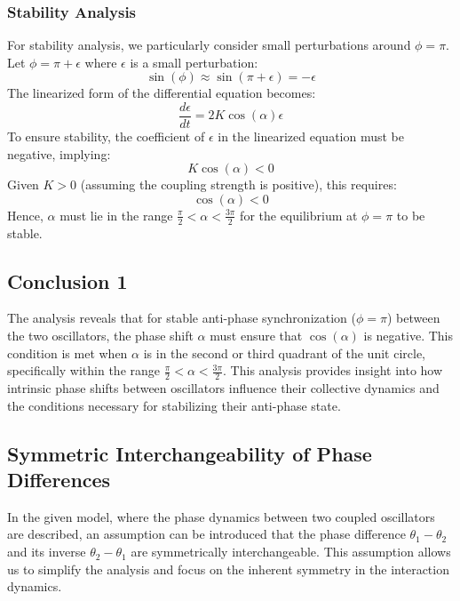 \documentclass[12pt,a4paper]{article}
\begin{document}
\subsubsection{Stability Analysis}
For stability analysis, we particularly consider small perturbations around \(\phi = \pi\). Let \(\phi = \pi + \epsilon\) where \(\epsilon\) is a small perturbation:
\begin{equation}
    \sin(\phi) \approx \sin(\pi + \epsilon) = -\epsilon
\end{equation}
The linearized form of the differential equation becomes:
\begin{equation}
    \frac{d\epsilon}{dt} = 2K \cos(\alpha) \epsilon
\end{equation}
To ensure stability, the coefficient of \(\epsilon\) in the linearized equation must be negative, implying:
\begin{equation}
    K \cos(\alpha) < 0
\end{equation}
Given \(K > 0\) (assuming the coupling strength is positive), this requires:
\begin{equation}
    \cos(\alpha) < 0
\end{equation}
Hence, \(\alpha\) must lie in the range \(\frac{\pi}{2} < \alpha < \frac{3\pi}{2}\) for the equilibrium at \(\phi = \pi\) to be stable.

\subsection{Conclusion 1}
The analysis reveals that for stable anti-phase synchronization (\(\phi = \pi\)) between the two oscillators, the phase shift \(\alpha\) must ensure that \(\cos(\alpha)\) is negative. This condition is met when \(\alpha\) is in the second or third quadrant of the unit circle, specifically within the range \(\frac{\pi}{2} < \alpha < \frac{3\pi}{2}\). This analysis provides insight into how intrinsic phase shifts between oscillators influence their collective dynamics and the conditions necessary for stabilizing their anti-phase state.

\subsection{Symmetric Interchangeability of Phase Differences}
In the given model, where the phase dynamics between two coupled oscillators are described, an assumption can be introduced that the phase difference \(\theta_1 - \theta_2\) and its inverse \(\theta_2 - \theta_1\) are symmetrically interchangeable. This assumption allows us to simplify the analysis and focus on the inherent symmetry in the interaction dynamics.
\end{document}
